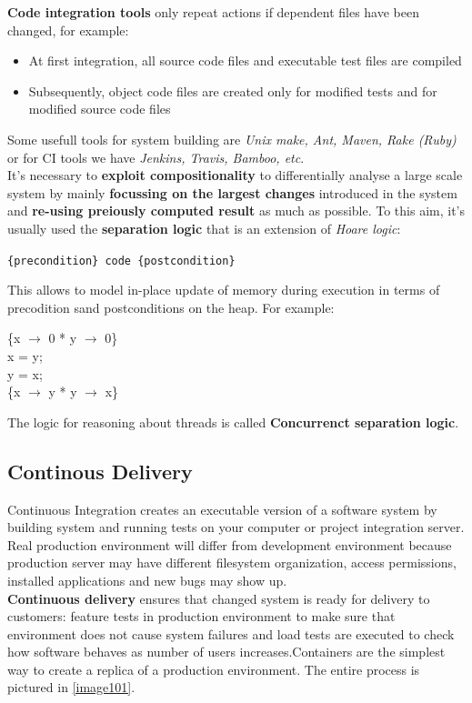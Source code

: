 \documentclass[10pt,a4paper]{report}
\begin{document}
\textbf{Code integration tools} only repeat actions if dependent files have been changed, for example:
\begin{itemize}
	\item  At first integration, all source code files and executable test files are compiled
	\item Subsequently, object code files are created only for modified tests and for modified source code files
\end{itemize}
Some usefull tools for system building are \textit{Unix make, Ant, Maven, Rake (Ruby)} or for CI tools we have \textit{Jenkins, Travis, Bamboo, etc}. \\
It's necessary to \textbf{exploit compositionality} to differentially analyse a large scale system by mainly \textbf{focussing on the largest changes} introduced in the system and \textbf{re-using preiously computed result} as much as possible. To this aim, it's usually used the \textbf{separation logic} that is an extension of \textit{Hoare logic}:
\begin{center}
	\texttt{\{precondition\} code \{postcondition\}}
\end{center}
This allows to model  in-place update of memory during execution in terms of precodition sand postconditions on the heap. For example:
\begin{center}
	\{x $\rightarrow$ 0 * y $\rightarrow$ 0\}\\
	x = y;\\
	y = x;\\
	\{x $\rightarrow$ y * y $\rightarrow$ x\}
\end{center}
The logic for reasoning about threads is called \textbf{Concurrenct separation logic}.
\subsection{Continous Delivery}
Continuous Integration creates an executable version of a software system by building system and running tests on your computer or project integration server. Real production environment will differ from development
environment because production server may have different filesystem organization, access permissions, installed applications and new bugs may show up.\\
\textbf{Continuous delivery} ensures that changed system is ready for delivery to customers: feature tests in production environment to make sure that environment does not cause system failures and load tests are executed to check how software behaves as number of users increases.Containers are the simplest way to create a replica of a production environment. The entire process is pictured in \ref{image101}. 
\end{document}
